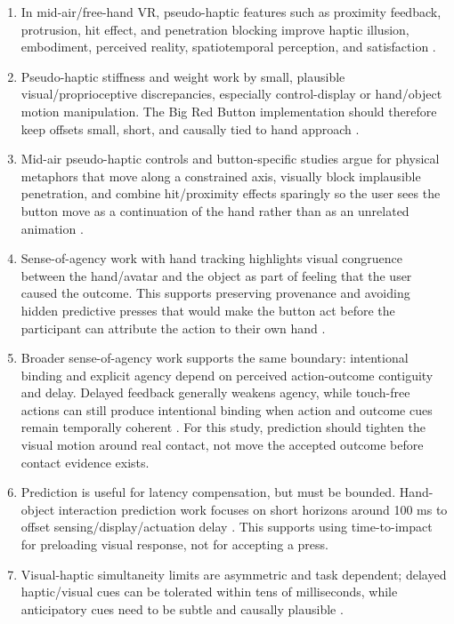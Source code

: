 \documentclass[11pt]{article}
\begin{document}
\begin{enumerate}
  \item In mid-air/free-hand VR, pseudo-haptic features such as proximity feedback, protrusion, hit effect, and penetration blocking improve haptic illusion, embodiment, perceived reality, spatiotemporal perception, and satisfaction \cite{kim2022pseudobutton}.
  \item Pseudo-haptic stiffness and weight work by small, plausible visual/proprioceptive discrepancies, especially control-display or hand/object motion manipulation. The Big Red Button implementation should therefore keep offsets small, short, and causally tied to hand approach \cite{samad2019pseudoweight,weiss2023pseudostiffness}.
  \item Mid-air pseudo-haptic controls and button-specific studies argue for physical metaphors that move along a constrained axis, visually block implausible penetration, and combine hit/proximity effects sparingly so the user sees the button move as a continuation of the hand rather than as an unrelated animation \cite{speicher2019pseudocontrols,kim2022pseudobutton}.
  \item Sense-of-agency work with hand tracking highlights visual congruence between the hand/avatar and the object as part of feeling that the user caused the outcome. This supports preserving provenance and avoiding hidden predictive presses that would make the button act before the participant can attribute the action to their own hand \cite{evangelou2023agency}.
  \item Broader sense-of-agency work supports the same boundary: intentional binding and explicit agency depend on perceived action-outcome contiguity and delay. Delayed feedback generally weakens agency, while touch-free actions can still produce intentional binding when action and outcome cues remain temporally coherent \cite{haggard2002voluntary,wen2015delayagency,wen2019delayreview,liu2024intentionalbinding}. For this study, prediction should tighten the visual motion around real contact, not move the accepted outcome before contact evidence exists.
  \item Prediction is useful for latency compensation, but must be bounded. Hand-object interaction prediction work focuses on short horizons around 100 ms to offset sensing/display/actuation delay \cite{salvato2022prediction}. This supports using time-to-impact for preloading visual response, not for accepting a press.
  \item Visual-haptic simultaneity limits are asymmetric and task dependent; delayed haptic/visual cues can be tolerated within tens of milliseconds, while anticipatory cues need to be subtle and causally plausible \cite{diluca2019simultaneity}.

\end{enumerate}
\end{document}
